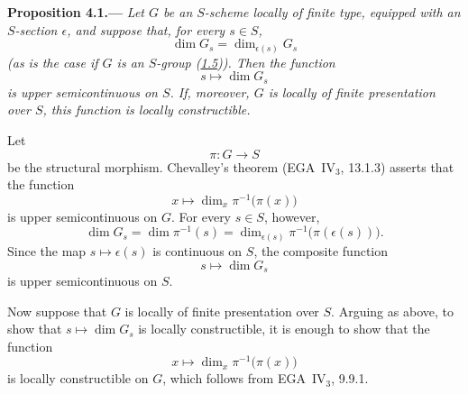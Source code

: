 \medskip
{}\label{prop:sga3-VIB-4.1}%
\noindent\textbf{Proposition 4.1.---}
\emph{Let \(G\) be an \(S\)-scheme locally of finite type, equipped
with an \(S\)-section \(\epsilon\), and suppose that, for every
\(s\in S\),}
\[
  \dim G_s=\dim_{\epsilon(s)}G_s
\]
\emph{\textup{(as is the case if \(G\) is an \(S\)-group
\textup(\hyperref[lem:sga3-VIB-1.5]{1.5}\textup))}. Then the function}
\[
  s\longmapsto\dim G_s
\]
\emph{is upper semicontinuous on \(S\). If, moreover, \(G\) is locally of
finite presentation over \(S\), this function is locally constructible.}

Let
\[
  \pi:G\longrightarrow S
\]
be the structural morphism. Chevalley's theorem
(EGA~IV\(_3\), 13.1.3) asserts that the function
\[
  x\longmapsto\dim_x\pi^{-1}\bigl(\pi(x)\bigr)
\]
is upper semicontinuous on \(G\). For every \(s\in S\), however,
\[
  \dim G_s
    =\dim\pi^{-1}(s)
    =\dim_{\epsilon(s)}
       \pi^{-1}\bigl(\pi(\epsilon(s))\bigr).
\]
Since the map \(s\mapsto\epsilon(s)\) is continuous on \(S\), the
composite function
\[
  s\longmapsto\dim G_s
\]
is upper semicontinuous on \(S\).

Now suppose that \(G\) is locally of finite presentation over
\(S\). Arguing as above, to show that \(s\mapsto\dim G_s\) is
locally constructible, it is enough to show that the function
\[
  x\longmapsto\dim_x\pi^{-1}\bigl(\pi(x)\bigr)
\]
is locally constructible on \(G\), which follows from
EGA~IV\(_3\), 9.9.1.

